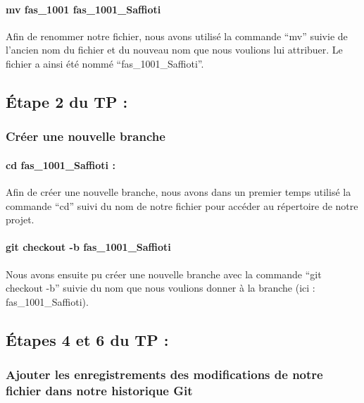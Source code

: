 \documentclass[
  letterpaper,
  DIV=11,
  numbers=noendperiod]{scrartcl}
\let\oldparagraph\paragraph
\renewcommand{\paragraph}[1]{\oldparagraph{#1}\mbox{}}
\begin{document}
\hypertarget{mv-fas_1001-fas_1001_saffioti}{%
\paragraph{mv fas\_1001
fas\_1001\_Saffioti}\label{mv-fas_1001-fas_1001_saffioti}}

Afin de renommer notre fichier, nous avons utilisé la commande ``mv''
suivie de l'ancien nom du fichier et du nouveau nom que nous voulions
lui attribuer. Le fichier a ainsi été nommé ``fas\_1001\_Saffioti''.

\hypertarget{uxe9tape-2-du-tp}{%
\subsection{Étape 2 du TP :}\label{uxe9tape-2-du-tp}}

\hypertarget{cruxe9er-une-nouvelle-branche}{%
\subsubsection{Créer une nouvelle
branche}\label{cruxe9er-une-nouvelle-branche}}

\hypertarget{cd-fas_1001_saffioti}{%
\paragraph{cd fas\_1001\_Saffioti :}\label{cd-fas_1001_saffioti}}

Afin de créer une nouvelle branche, nous avons dans un premier temps
utilisé la commande ``cd'' suivi du nom de notre fichier pour accéder au
répertoire de notre projet.

\hypertarget{git-checkout--b-fas_1001_saffioti}{%
\paragraph{git checkout -b
fas\_1001\_Saffioti}\label{git-checkout--b-fas_1001_saffioti}}

Nous avons ensuite pu créer une nouvelle branche avec la commande ``git
checkout -b'' suivie du nom que nous voulions donner à la branche (ici :
fas\_1001\_Saffioti).

\hypertarget{uxe9tapes-4-et-6-du-tp}{%
\subsection{Étapes 4 et 6 du TP :}\label{uxe9tapes-4-et-6-du-tp}}

\hypertarget{ajouter-les-enregistrements-des-modifications-de-notre-fichier-dans-notre-historique-git}{%
\subsubsection{Ajouter les enregistrements des modifications de notre
fichier dans notre historique
Git}\label{ajouter-les-enregistrements-des-modifications-de-notre-fichier-dans-notre-historique-git}}
\end{document}
